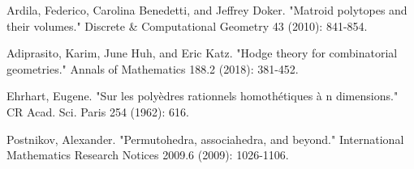 \documentclass[12pt]{article}
\theoremstyle{definition}
\numberwithin{equation}{subsection}
\begin{document}
\begin{thebibliography}{99}
 Ardila, Federico, Carolina Benedetti, and Jeffrey Doker. "Matroid polytopes and their volumes." Discrete \& Computational Geometry 43 (2010): 841-854.

 Adiprasito, Karim, June Huh, and Eric Katz. "Hodge theory for combinatorial geometries." Annals of Mathematics 188.2 (2018): 381-452.

 Ehrhart, Eugene. "Sur les polyèdres rationnels homothétiques à n dimensions." CR Acad. Sci. Paris 254 (1962): 616.

 Postnikov, Alexander. "Permutohedra, associahedra, and beyond." International Mathematics Research Notices 2009.6 (2009): 1026-1106.

\end{thebibliography}
\end{document}

